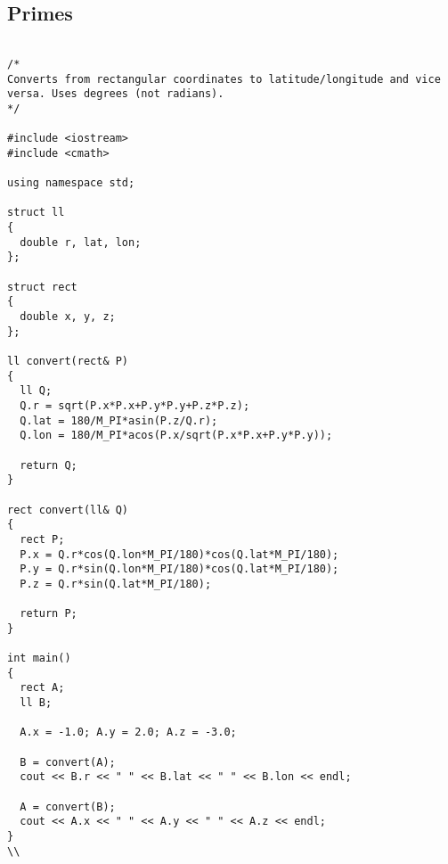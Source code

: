 \subsection{Primes}
\begin{lstlisting}

/*
Converts from rectangular coordinates to latitude/longitude and vice
versa. Uses degrees (not radians).
*/

#include <iostream>
#include <cmath>

using namespace std;

struct ll
{
  double r, lat, lon;
};

struct rect
{
  double x, y, z;
};

ll convert(rect& P)
{
  ll Q;
  Q.r = sqrt(P.x*P.x+P.y*P.y+P.z*P.z);
  Q.lat = 180/M_PI*asin(P.z/Q.r);
  Q.lon = 180/M_PI*acos(P.x/sqrt(P.x*P.x+P.y*P.y));
  
  return Q;
}

rect convert(ll& Q)
{
  rect P;
  P.x = Q.r*cos(Q.lon*M_PI/180)*cos(Q.lat*M_PI/180);
  P.y = Q.r*sin(Q.lon*M_PI/180)*cos(Q.lat*M_PI/180);
  P.z = Q.r*sin(Q.lat*M_PI/180);
  
  return P;
}

int main()
{
  rect A;
  ll B;
  
  A.x = -1.0; A.y = 2.0; A.z = -3.0;
  
  B = convert(A);
  cout << B.r << " " << B.lat << " " << B.lon << endl;
  
  A = convert(B);
  cout << A.x << " " << A.y << " " << A.z << endl;
}
\\
\end{lstlisting}